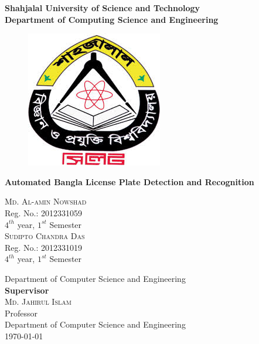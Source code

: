 \documentclass{standalone}
\begin{document}
\begin{titlepage}
\begin{center}

    {\huge \bf Shahjalal University of Science and Technology}\\
    {\LARGE \bf Department of Computing Science and Engineering}

    \vfill
    \begin{figure}[h]
    \centering
    \includegraphics[scale=0.6]{./img/varsityLogo}
    \end{figure}


    \vfill 
    {\LARGE \bf Automated Bangla License Plate Detection and Recognition}\\      
    \begin{multicols}{2}
    \textsc{\Large Md. Al-amin Nowshad}\\
    Reg. No.: 2012331059\\ $4^{th}$ year, $1^{st}$ Semester\\
    \textsc{\Large Sudipto Chandra Das} \\
    Reg. No.: 2012331019\\ $4^{th}$ year, $1^{st}$ Semester
    \end{multicols}

	\vfill
    Department of Computer Science and Engineering\\
    
	\vfill
    {\bf Supervisor}\\
    \textsc{\Large Md. Jahirul Islam} \\
    Professor\\ 
    Department of Computer Science and Engineering\\
    
    \vfill
	\today
        
\newpage
	

\end{center}
\end{titlepage}
\end{document}
